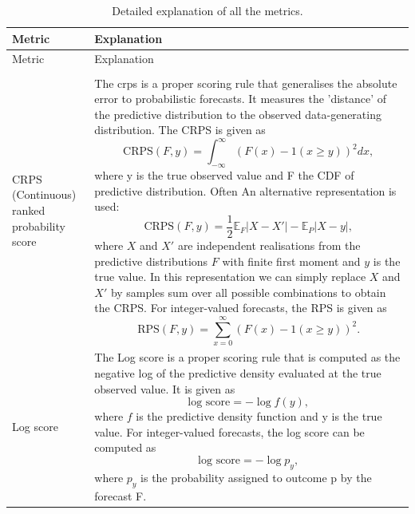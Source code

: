 \documentclass[
]{jss}
\begin{document}
\begin{CodeChunk}

\begin{longtable}[t]{>{\raggedright\arraybackslash}p{1.1in}>{\raggedright\arraybackslash}p{4.625in}}
\toprule
Metric & Explanation\\
\midrule
\endfirsthead
\toprule
Metric & Explanation\\
\midrule
\endhead

\noalign{\vskip 6mm}
\caption{Detailed explanation of all the metrics.}\\
\endfoot
\bottomrule
\endlastfoot
CRPS (Continuous) ranked probability score & The crps is a proper scoring rule that generalises the absolute error to probabilistic forecasts. It measures the 'distance' of the predictive distribution to the observed data-generating distribution. The CRPS is given as
  $$\text{CRPS}(F, y) = \int_{-\infty}^\infty \left( F(x) - 1(x \geq y) \right)^2 dx,$$
  where y is the true observed value and F the CDF of predictive distribution. Often An alternative representation is used:
  $$ \text{CRPS}(F, y) = \frac{1}{2} \mathbb{E}_{F} |X - X'| - \mathbb{E}_P |X - y|,$$ where $X$ and $X'$ are independent realisations from the predictive distributions $F$ with finite first moment and $y$ is the true value. In this representation we can simply replace $X$ and $X'$ by samples sum over all possible combinations to obtain the CRPS.
  For integer-valued forecasts, the RPS is given as
  $$ \text{RPS}(F, y) = \sum_{x = 0}^\infty (F(x) - 1(x \geq y))^2. $$

\cellcolor{gray!6}{  \textbf{Usage and caveats} Smaller values are better. The crps is a good choice for most practical purposes that involve decision making, as it takes the entire predictive distribution into account. If two forecasters assign the same probability to the true event $y$, then the forecaster who assigned high probability to events far away from $y$ will still get a worse score. The crps (in contrast to the log score) can at times be quite lenient towards extreme mispredictions. Also, due to it's similarity to the absolute error, the level of scores depend a lot on the absolute value of what is predicted, which makes it hard to compare scores of forecasts for quantities that are orders of magnitude apart.}\\
\addlinespace
Log score & The Log score is a proper scoring rule that is computed as the negative log of the predictive density evaluated at the true observed value. It is given as
  $$ \text{log score} = -\log f(y), $$
  where $f$ is the predictive density function and y is the true value. For integer-valued forecasts, the log score can be computed as
  $$ \text{log score} = -\log p_y, $$
  where $p_y$ is the probability assigned to outcome p by the forecast F.


\end{longtable}
\end{CodeChunk}
\end{document}
